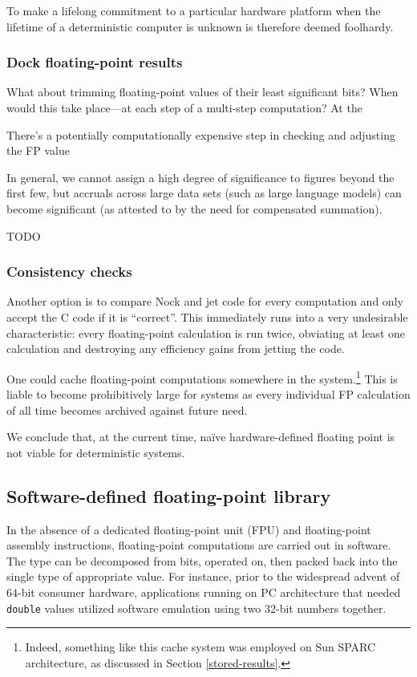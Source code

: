 \documentclass[twoside]{article}
\begin{document}
To make a lifelong commitment to a particular hardware platform when the lifetime of a deterministic computer is unknown is therefore deemed foolhardy.

\subsubsection{Dock floating-point results}

What about trimming floating-point values of their least significant bits?  When would this take place—at each step of a multi-step computation?  At the 

There's a potentially computationally expensive step in checking and adjusting the FP value 

In general, we cannot assign a high degree of significance to figures beyond the first few, but accruals across large data sets (such as large language models) can become significant (as attested to by the need for compensated summation).

TODO

\subsubsection{Consistency checks}

Another option is to compare Nock and jet code for every computation and only accept the C code if it is “correct”.  This immediately runs into a very undesirable characteristic:  every floating-point calculation is run twice, obviating at least one calculation and destroying any efficiency gains from jetting the code.

One could cache floating-point computations somewhere in the system.\footnote{Indeed, something like this cache system was employed on Sun SPARC architecture, as discussed in Section \ref{stored-results}.}  This is liable to become prohibitively large for systems as every individual FP calculation of all time becomes archived against future need.

We conclude that, at the current time, naïve hardware-defined floating point is not viable for deterministic systems.

\subsection{Software-defined floating-point library}

In the absence of a dedicated floating-point unit (FPU) and floating-point assembly instructions, floating-point computations are carried out in software.  The type can be decomposed from bits, operated on, then packed back into the single type of appropriate value.  For instance, prior to the widespread advent of 64-bit consumer hardware, applications running on PC architecture that needed \texttt{double} values utilized software emulation using two 32-bit numbers together.
\end{document}
